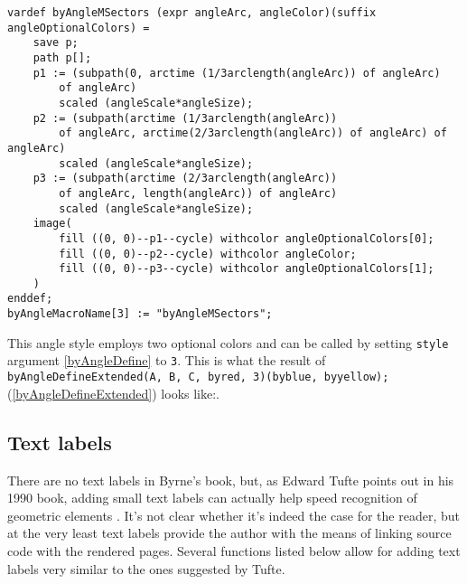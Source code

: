 \begin{lstlisting}	
vardef byAngleMSectors (expr angleArc, angleColor)(suffix angleOptionalColors) =
    save p;
    path p[];
    p1 := (subpath(0, arctime (1/3arclength(angleArc)) of angleArc) 
    	of angleArc) 
    	scaled (angleScale*angleSize);
    p2 := (subpath(arctime (1/3arclength(angleArc)) 
    	of angleArc, arctime(2/3arclength(angleArc)) of angleArc) of angleArc) 
    	scaled (angleScale*angleSize);
    p3 := (subpath(arctime (2/3arclength(angleArc)) 
    	of angleArc, length(angleArc)) of angleArc) 
    	scaled (angleScale*angleSize);
    image(
        fill ((0, 0)--p1--cycle) withcolor angleOptionalColors[0];
        fill ((0, 0)--p2--cycle) withcolor angleColor;
        fill ((0, 0)--p3--cycle) withcolor angleOptionalColors[1];
    )
enddef;
byAngleMacroName[3] := "byAngleMSectors";
\end{lstlisting}

This angle style employs two optional colors and can be called by setting \texttt{style} argument \ref{byAngleDefine} to \texttt{3}. This is what the result of \texttt{byAngleDefineExtended(A, B, C, byred, 3)(byblue, byyellow);} (\ref{byAngleDefineExtended}) looks like:.






\subsection{Text labels}\label{textlabels}

There are no text labels in Byrne's book, but, as Edward Tufte points out in his 1990 book, adding small text labels can actually help speed recognition of geometric elements \cite{Tufte90}. It's not clear whether it's indeed the case for the reader, but at the very least text labels provide the author with the means of linking source code with the rendered pages. Several functions listed below allow for adding text labels very similar to the ones suggested by Tufte.

